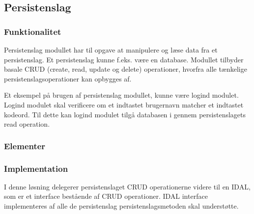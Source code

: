 \subsection{Persistenslag}
\label{sub:persistenslag}

\subsubsection{Funktionalitet}
\label{ssub:Funktionalitet}


Persistenslag modullet har til opgave at manipulere og læse data fra et persistenslag. Et persistenslag kunne f.eks. være en database. Modullet tilbyder basale CRUD (create, read, update og delete) operationer, hvorfra alle tænkelige persistenslagsoperationer kan opbygges af.

Et eksempel på brugen af persistenslag modullet, kunne være logind modulet. Logind modulet skal verificere om et indtastet brugernavn matcher et indtastet kodeord. Til dette kan logind modulet tilgå databasen i gennem persistenslagets read operation.

\subsubsection{Elementer}
\label{ssub:Elementer}



\subsubsection{Implementation}
\label{ssub:Implementation}

I denne løsning delegerer persistenslaget CRUD operationerne videre til en IDAL, som er et interface bestående af CRUD operationer. IDAL interface implementeres af alle de persistenslag persistenslagsmetoden skal understøtte.
